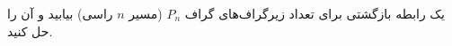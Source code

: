 \EXERCISE
یک رابطه بازگشتی برای تعداد زیرگراف‌های گراف
$P_n$
(مسیر
$n$
راسی) بیابید و آن را حل کنید.